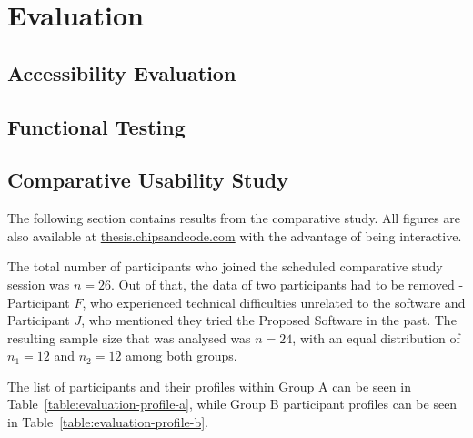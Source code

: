 \chapter{Evaluation}


\section{Accessibility Evaluation}
\label{Evaluation-Accessibility}


\section{Functional Testing}
\label{Evaluation-Tests}



\section{Comparative Usability Study}
\label{Evaluation-UX}

The following section contains results from the comparative study.
All figures are also available at \href{https://thesis.chipsandcode.com}{thesis.chipsandcode.com} with the advantage of being interactive.

The total number of participants who joined the scheduled comparative study session was $n=26$.
Out of that, the data of two participants had to be removed - Participant $F$, who experienced technical difficulties unrelated to the software and Participant $J$, who mentioned they tried the Proposed Software in the past.
The resulting sample size that was analysed was $n=24$, with an equal distribution of $n_1=12$ and $n_2=12$ among both groups.

The list of participants and their profiles within Group A can be seen in Table~\ref{table:evaluation-profile-a}, while Group B participant profiles can be seen in Table~\ref{table:evaluation-profile-b}.

